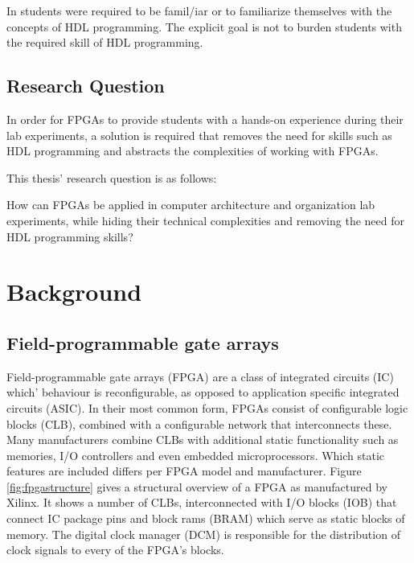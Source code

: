 \documentclass[openright]{template/uva-bachelor-thesis}
\begin{document}
In \cite{el2011teaching, nakano2008processor, kellett2012project, jansen2014every, pereira2012basic, paharsingh2009novel, cifredo2015computer} students were required to be famil/iar or to familiarize themselves with the concepts of HDL programming. The explicit goal is not to burden students with the required skill of HDL programming. 









\section{Research Question}

In order for FPGAs to provide students with a hands-on experience during their lab experiments, a solution is required 
that removes the need for skills such as HDL programming and abstracts the complexities of working with FPGAs.

This thesis' research question is as follows: 

\begin{displayquote}
How can FPGAs be applied in computer architecture and organization lab experiments, while hiding their technical complexities and removing the need for HDL programming skills?
\end{displayquote}







\chapter{Background}


\section{Field-programmable gate arrays}
Field-programmable gate arrays (FPGA) are a class of integrated circuits (IC) which' behaviour is reconfigurable, as opposed to application specific integrated circuits (ASIC). In their most common form, FPGAs consist of configurable logic blocks (CLB), combined with a configurable network that interconnects these. Many manufacturers combine CLBs with additional static functionality such as memories, I/O controllers and even embedded microprocessors. Which static features are included differs per FPGA model and manufacturer. Figure \ref{fig:fpgastructure} gives a structural overview of a FPGA as manufactured by Xilinx. It shows a number of CLBs, interconnected with I/O blocks (IOB) that connect IC package pins and block rams (BRAM) which serve as static blocks of memory. The digital clock manager (DCM) is responsible for the distribution of clock signals to every of the FPGA's blocks. 
\end{document}
